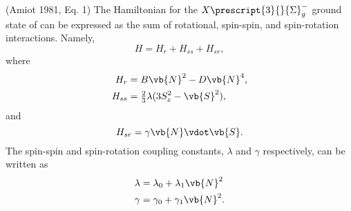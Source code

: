 \documentclass[11pt, twoside, fleqn]{report}
\newcommand{\state}[2]{\prescript{#1}{}{#2}}
\begin{document}
    (Amiot 1981, Eq. 1)
    The Hamiltonian for the $X\state{3}{\Sigma}_{g}^{-}$ ground state of  can be expressed as the sum of rotational, spin-spin, and spin-rotation interactions. Namely,
    \begin{equation*}
        H = H_{r} + H_{ss} + H_{sr},
    \end{equation*}
    where
    \begin{align*}
        H_{r}  & = B\vb{N}^{2} - D\vb{N}^{4},                    \\
        H_{ss} & = \tfrac{2}{3}\lambda(3S_{z}^{2} - \vb{S}^{2}),
    \end{align*}
    and
    \begin{equation*}
        H_{sr} = \gamma\vb{N}\vdot\vb{S}.
    \end{equation*}
    The spin-spin and spin-rotation coupling constants, $\lambda$ and $\gamma$ respectively, can be written as
    \begin{align*}
        \lambda & = \lambda_{0} + \lambda_{1}\vb{N}^{2} \\
        \gamma  & = \gamma_{0} + \gamma_{1}\vb{N}^{2}.
    \end{align*}
\end{document}
